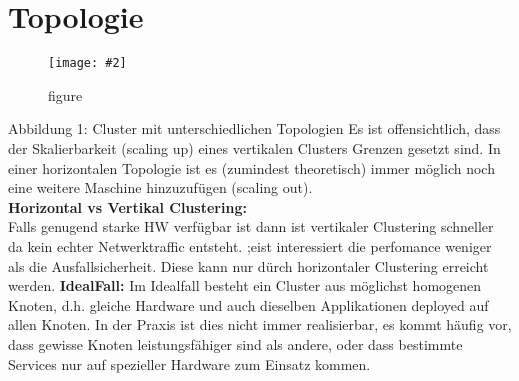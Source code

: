 \documentclass[a4paper,10pt]{scrreprt}
\newcommand{\pic}[2][figure]{\begin{figure}[h]
 \centering
 \texttt{[image: \#2]}
 \caption{#1}
\end{figure}
}
\begin{document}
\section{Topologie} %
\label{sec:topologie}
\pic{cltop.png}
Abbildung 1: Cluster mit unterschiedlichen Topologien
Es ist offensichtlich, dass der Skalierbarkeit (scaling up) eines vertikalen Clusters Grenzen gesetzt sind. In einer
horizontalen Topologie ist es (zumindest theoretisch) immer möglich noch eine weitere Maschine hinzuzufügen
(scaling out).\\

\textbf{Horizontal vs Vertikal Clustering:}\\
Falls genugend starke HW verfügbar ist dann ist vertikaler Clustering schneller da kein echter Netwerktraffic entsteht. ;eist interessiert die perfomance weniger als die Ausfallsicherheit. Diese kann nur dürch horizontaler Clustering erreicht werden.
\textbf{IdealFall:} Im Idealfall besteht ein Cluster aus möglichst homogenen Knoten, d.h. gleiche Hardware und auch dieselben
Applikationen deployed auf allen Knoten. In der Praxis ist dies nicht immer realisierbar, es kommt häufig vor,
dass gewisse Knoten leistungsfähiger sind als andere, oder dass bestimmte Services nur auf spezieller Hardware
zum Einsatz kommen.

\end{document}
